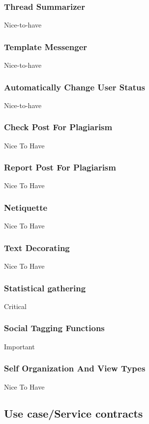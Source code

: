 \documentclass[12pt, oneside]{article}
\begin{document}
\subsubsection{Thread Summarizer}
Nice-to-have
\subsubsection{Template Messenger}
Nice-to-have
\subsubsection{Automatically Change User Status}
Nice-to-have
\subsubsection{Check Post For Plagiarism}
Nice To Have
\subsubsection{Report Post For Plagiarism}
Nice To Have
\subsubsection{Netiquette}
Nice To Have
\subsubsection{Text Decorating}
Nice To Have
\subsubsection{Statistical gathering}
Critical
\subsubsection{Social Tagging Functions}
Important
\subsubsection{Self Organization And View Types}
Nice To Have


\subsection{Use case/Service contracts}
\end{document}
